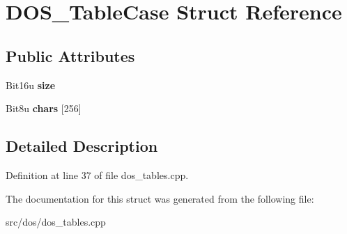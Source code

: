 \hypertarget{structDOS__TableCase}{\section{D\-O\-S\-\_\-\-Table\-Case Struct Reference}
\label{structDOS__TableCase}
}
\subsection*{Public Attributes}
\begin{DoxyCompactItemize}
\item 
\hypertarget{structDOS__TableCase_aa37ae3c4e7b692b2d03feb6048acc20c}{Bit16u {\bfseries size}}\label{structDOS__TableCase_aa37ae3c4e7b692b2d03feb6048acc20c}

\item 
\hypertarget{structDOS__TableCase_ab2e496ce3c2d3bbdb820be16c0a4cd74}{Bit8u {\bfseries chars} \mbox{[}256\mbox{]}}\label{structDOS__TableCase_ab2e496ce3c2d3bbdb820be16c0a4cd74}

\end{DoxyCompactItemize}


\subsection{Detailed Description}


Definition at line 37 of file dos\-\_\-tables.\-cpp.



The documentation for this struct was generated from the following file\-:\begin{DoxyCompactItemize}
\item 
src/dos/dos\-\_\-tables.\-cpp\end{DoxyCompactItemize}
